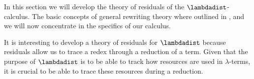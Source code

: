 In this section we will develop the theory of residuals of the $\lambdadist$-calculus.
The basic concepts of general rewriting theory where outlined in ,
and we will now concentrate in the specifics of our calculus.

It is interesting to develop a theory of residuals for $\lambdadist$ because
residuals allow us to trace a redex through a reduction of a term.
Given that the purpose of $\lambdadist$ is to be able to track
how resources are used in $\lambda$-terms, it is crucial to
be able to trace these resources during a reduction.

